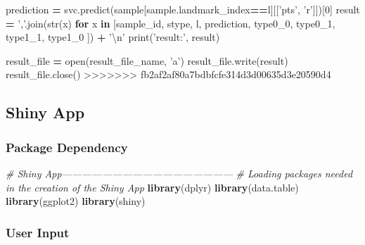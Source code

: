 \documentclass[10pt,letterpaper]{article}
\newenvironment{Shaded}{\begin{snugshade}}{\end{snugshade}}
\newcommand{\KeywordTok}[1]{\textcolor[rgb]{0.13,0.29,0.53}{\textbf{#1}}}
\newcommand{\DecValTok}[1]{\textcolor[rgb]{0.00,0.00,0.81}{#1}}
\newcommand{\CharTok}[1]{\textcolor[rgb]{0.31,0.60,0.02}{#1}}
\newcommand{\StringTok}[1]{\textcolor[rgb]{0.31,0.60,0.02}{#1}}
\newcommand{\CommentTok}[1]{\textcolor[rgb]{0.56,0.35,0.01}{\textit{#1}}}
\newcommand{\ControlFlowTok}[1]{\textcolor[rgb]{0.13,0.29,0.53}{\textbf{#1}}}
\newcommand{\OperatorTok}[1]{\textcolor[rgb]{0.81,0.36,0.00}{\textbf{#1}}}
\newcommand{\BuiltInTok}[1]{#1}
\newcommand{\NormalTok}[1]{#1}
\begin{document}
\begin{Shaded}
\begin{Highlighting}[]
\NormalTok{        prediction }\OperatorTok{=}
\NormalTok{            svc.predict(sample[sample.landmark_index}\OperatorTok{==}\NormalTok{l][[}\StringTok{'pts'}\NormalTok{, }\StringTok{'r'}\NormalTok{]])[}\DecValTok{0}\NormalTok{]}
\NormalTok{        result }\OperatorTok{=} \StringTok{','}\NormalTok{.join(}\BuiltInTok{str}\NormalTok{(x) }\ControlFlowTok{for}\NormalTok{ x }\KeywordTok{in}\NormalTok{ [sample_id, stype, l, prediction,}
\NormalTok{            type0_0, type0_1, type1_1, type1_0 ]) }\OperatorTok{+} \StringTok{'}\CharTok{\textbackslash{}n}\StringTok{'}
        \BuiltInTok{print}\NormalTok{(}\StringTok{'result:'}\NormalTok{, result)}

\NormalTok{        result_file }\OperatorTok{=} \BuiltInTok{open}\NormalTok{(result_file_name, }\StringTok{'a'}\NormalTok{)}
\NormalTok{        result_file.write(result)}
\NormalTok{        result_file.close()}
>>>>>>> fb2af2af80a7bdbfcfe314d3d00635d3e20590d4
\end{Highlighting}
\end{Shaded}

\subsection{Shiny App}\label{shiny-app}

\subsubsection{Package Dependency}\label{package-dependency}

\begin{Shaded}
\begin{Highlighting}[]
\CommentTok{# Shiny App---------------------------------------------------}
\CommentTok{# Loading packages needed in the creation of the Shiny App}
\KeywordTok{library}\NormalTok{(dplyr)}
\KeywordTok{library}\NormalTok{(data.table)}
\KeywordTok{library}\NormalTok{(ggplot2)}
\KeywordTok{library}\NormalTok{(shiny)}
\end{Highlighting}
\end{Shaded}

\subsubsection{User Input}\label{user-input}
\end{document}
